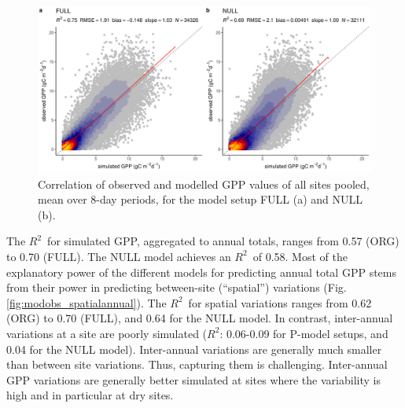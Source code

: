 \documentclass[gmd, manuscript]{copernicus}
\newcommand{\rsq}{$R^2$}
\begin{document}
\begin{figure}[t]
    \includegraphics[width=12cm]{fig/modobs_xdaily.pdf}
    \caption{Correlation of observed and modelled GPP values of all sites pooled, mean over 8-day periods, for the model setup FULL (a) and NULL (b).}
    \label{fig:modobs_xdaily}
\end{figure}
The \rsq\ for simulated GPP, aggregated to annual totals, ranges from 0.57 (ORG) to 0.70 (FULL). The NULL model achieves an \rsq\ of 0.58. Most of the explanatory power of the different models for predicting annual total GPP stems from their power in predicting between-site (``spatial'') variations (Fig. \ref{fig:modobs_spatialannual}). The \rsq\ for spatial variations ranges from 0.62 (ORG) to 0.70 (FULL), and 0.64 for the NULL model. In contrast, inter-annual  variations at a site are poorly simulated (\rsq : 0.06-0.09 for P-model setups, and 0.04 for the NULL model). Inter-annual variations are generally much smaller than between site variations. Thus, capturing them is challenging. Inter-annual GPP variations are generally better simulated at sites where the variability is high and in particular at dry sites. 
\end{document}
